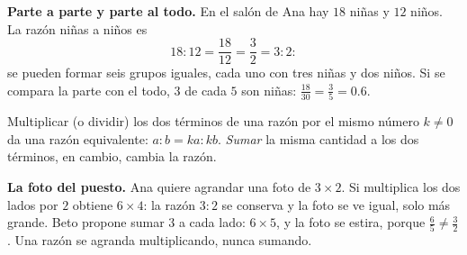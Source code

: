 \documentclass[11pt,a4paper]{article}
\begin{document}
\begin{minipage}[c]{0.5\linewidth}
\textbf{Parte a parte y parte al todo.} En el salón de Ana hay $18$ niñas y $12$ niños. La razón niñas a niños es
\[ 18:12=\frac{18}{12}=\frac32=3:2: \]
se pueden formar seis grupos iguales, cada uno con tres niñas y dos niños. Si se compara la parte con el todo, $3$ de
cada $5$ son niñas: $\tfrac{18}{30}=\tfrac35=0.6$.
\end{minipage}\hfill
\begin{minipage}[c]{0.46\linewidth}\centering
{}
\end{minipage}

\begin{propiedad}
Multiplicar (o dividir) los dos términos de una razón por el mismo número $k\neq0$ da una razón equivalente:
$a:b=ka:kb$. \emph{Sumar} la misma cantidad a los dos términos, en cambio, cambia la razón.
\end{propiedad}

\begin{minipage}[c]{0.48\linewidth}
\textbf{La foto del puesto.} Ana quiere agrandar una foto de $3\times2$. Si multiplica los dos lados por $2$ obtiene
$6\times4$: la razón $3:2$ se conserva y la foto se ve igual, solo más grande. Beto propone sumar $3$ a cada lado:
$6\times5$, y la foto se estira, porque $\tfrac65\neq\tfrac32$. Una razón se agranda multiplicando, nunca sumando.
\end{minipage}\hfill
\begin{minipage}[c]{0.48\linewidth}\centering
{}
\end{minipage}
\end{document}
